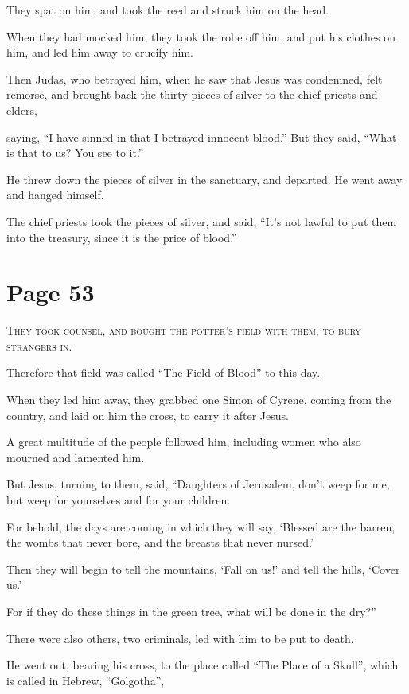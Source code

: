 They spat on him, and took the reed and struck him on the head.

When they had mocked him, they took the robe off him, and put his clothes on him, and led him away to crucify him.

Then Judas, who betrayed him, when he saw that Jesus was condemned, felt remorse, and brought back the thirty pieces of silver to the chief priests and elders,

saying, “I have sinned in that I betrayed innocent blood.” But they said, “What is that to us? You see to it.”

He threw down the pieces of silver in the sanctuary, and departed. He went away and hanged himself.

The chief priests took the pieces of silver, and said, “It’s not lawful to put them into the treasury, since it is the price of blood.”



\chapterornament
\section*{Page 53}

\lettrine{T}{hey took counsel, and bought the potter’s field with them, to bury strangers in.}

Therefore that field was called “The Field of Blood” to this day.

When they led him away, they grabbed one Simon of Cyrene, coming from the country, and laid on him the cross, to carry it after Jesus.

A great multitude of the people followed him, including women who also mourned and lamented him.

But Jesus, turning to them, said, “Daughters of Jerusalem, don’t weep for me, but weep for yourselves and for your children.

For behold, the days are coming in which they will say, ‘Blessed are the barren, the wombs that never bore, and the breasts that never nursed.’

Then they will begin to tell the mountains, ‘Fall on us!’ and tell the hills, ‘Cover us.’

For if they do these things in the green tree, what will be done in the dry?”

There were also others, two criminals, led with him to be put to death.

He went out, bearing his cross, to the place called “The Place of a Skull”, which is called in Hebrew, “Golgotha”,

